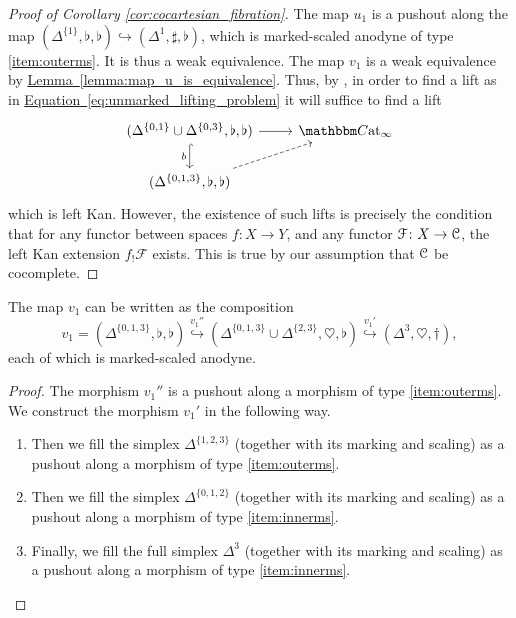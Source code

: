 \documentclass[main.tex]{subfiles}
\begin{document}
\begin{proof}[Proof of Corollary \ref{cor:cocartesian_fibration}]
    The map $u_{1}$ is a pushout along the map $(\Delta^{\{1\}}, \flat, \flat) \hookrightarrow (\Delta^{1}, \sharp, \flat)$, which is marked-scaled anodyne of type \ref{item:outerms}. It is thus a weak equivalence. The map $v_{1}$ is a weak equivalence by \hyperref[lemma:map_u_is_equivalence]{Lemma~\ref*{lemma:map_u_is_equivalence}}. Thus, by \cite[Prop.~A.2.3.1]{highertopostheory}, in order to find a lift as in \hyperref[eq:unmarked_lifting_problem]{Equation~\ref*{eq:unmarked_lifting_problem}} it will suffice to find a lift
  \begin{equation*}
    \begin{tikzcd}
      (\Delta^{\{0,1\}} \cup \Delta^{\{0,3\}}, \flat, \flat)
      \arrow[r]
      \arrow[d, hook, swap, "b"]
      & \ICCat
      \\
      (\Delta^{\{0,1,3\}}, \flat, \flat)
      \arrow[ur, dashed]
    \end{tikzcd}
  \end{equation*}
  which is left Kan. However, the existence of such lifts is precisely the condition that for any functor between spaces $f\colon X \to Y$, and any functor $\mathcal{F}\colon X \to \mathcal{C}$, the left Kan extension $f_{!}\mathcal{F}$ exists. This is true by our assumption that $\mathcal{C}$ be cocomplete.
\end{proof}

\begin{lemma}
  \label{lemma:map_u_is_equivalence}
  The map $v_{1}$ can be written as the composition
  \begin{equation*}
    v_{1} = (\Delta^{\{0,1,3\}}, \flat, \flat) \overset{v_{1}''}{\hookrightarrow} (\Delta^{\{0,1,3\}} \cup \Delta^{\{2,3\}}, \heartsuit, \flat) \overset{v_{1}'}{\hookrightarrow} (\Delta^{3}, \heartsuit, \dagger),
  \end{equation*}
  each of which is marked-scaled anodyne.
\end{lemma}
\begin{proof}
  The morphism $v_{1}''$ is a pushout along a morphism of type \ref{item:outerms}. We construct the morphism $v_{1}'$ in the following way.
  \begin{enumerate}
    \item Then we fill the simplex $\Delta^{\{1,2,3\}}$ (together with its marking and scaling) as a pushout along a morphism of type \ref{item:outerms}.

    \item Then we fill the simplex $\Delta^{\{0,1,2\}}$ (together with its marking and scaling) as a pushout along a morphism of type \ref{item:innerms}.

    \item Finally, we fill the full simplex $\Delta^{3}$ (together with its marking and scaling) as a pushout along a morphism of type \ref{item:innerms}.
  \end{enumerate}
\end{proof}
\end{document}
